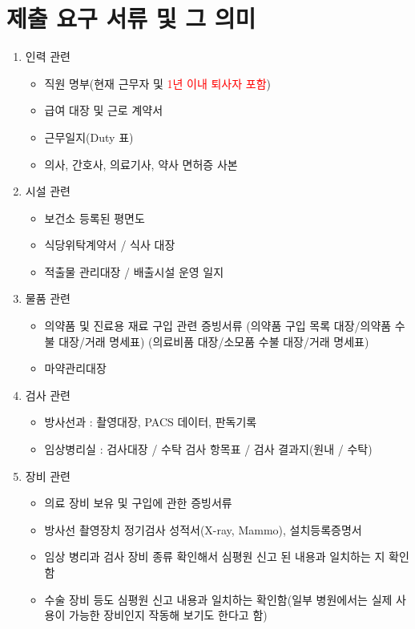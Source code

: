 \section{제출 요구 서류 및 그 의미}
\begin{enumerate}[①]\tightlist
\item 인력 관련
	\begin{itemize}\tightlist
	\item 직원 명부(현재 근무자 및 \textcolor{red}{1년 이내 퇴사자 포함}) 
	\item 급여 대장 및 근로 계약서
	\item 근무일지(Duty 표)
	\item 의사, 간호사, 의료기사, 약사 면허증 사본
	\end{itemize}
\item 시설 관련
	\begin{itemize}\tightlist
	\item 보건소 등록된 평면도
	\item 식당위탁계약서 / 식사 대장
	\item 적출물 관리대장 / 배출시설 운영 일지
	\end{itemize}	
\item 물품 관련
	\begin{itemize}\tightlist
	\item 의약품 및 진료용 재료 구입 관련 증빙서류\newline
 (의약품 구입 목록 대장/의약품 수불 대장/거래 명세표)\newline
 (의료비품 대장/소모품 수불 대장/거래 명세표) 
	\item 마약관리대장
	\end{itemize}	
\item 검사 관련
	\begin{itemize}\tightlist
	\item 방사선과 : 촬영대장, PACS 데이터, 판독기록 
	\item 임상병리실 : 검사대장 / 수탁 검사 항목표 / 검사 결과지(원내 / 수탁)
	\end{itemize}	
\item 장비 관련
	\begin{itemize}\tightlist
	\item 의료 장비 보유 및 구입에 관한 증빙서류
	\item 방사선 촬영장치 정기검사 성적서(X-ray, Mammo), 설치등록증명서
	\item 임상 병리과 검사 장비 종류 확인해서 심평원 신고 된 내용과 일치하는 지 확인함 
	\item 수술 장비 등도 심평원 신고 내용과 일치하는 확인함(일부 병원에서는 실제 사용이 가능한 장비인지 작동해 보기도 한다고 함)

\end{itemize}
\end{enumerate}
